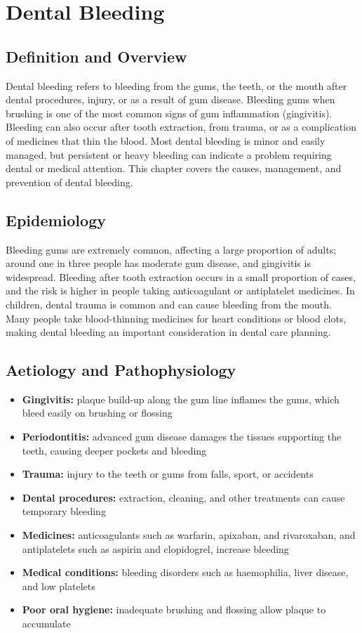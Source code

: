 \chapter{Dental Bleeding}

\section*{Definition and Overview}
Dental bleeding refers to bleeding from the gums, the teeth, or the mouth after dental procedures, injury, or as a result of gum disease. Bleeding gums when brushing is one of the most common signs of gum inflammation (gingivitis). Bleeding can also occur after tooth extraction, from trauma, or as a complication of medicines that thin the blood. Most dental bleeding is minor and easily managed, but persistent or heavy bleeding can indicate a problem requiring dental or medical attention. This chapter covers the causes, management, and prevention of dental bleeding.

\section*{Epidemiology}
Bleeding gums are extremely common, affecting a large proportion of adults; around one in three people has moderate gum disease, and gingivitis is widespread. Bleeding after tooth extraction occurs in a small proportion of cases, and the risk is higher in people taking anticoagulant or antiplatelet medicines. In children, dental trauma is common and can cause bleeding from the mouth. Many people take blood-thinning medicines for heart conditions or blood clots, making dental bleeding an important consideration in dental care planning.

\section*{Aetiology and Pathophysiology}
\begin{itemize}
    \item \textbf{Gingivitis:} plaque build-up along the gum line inflames the gums, which bleed easily on brushing or flossing
    \item \textbf{Periodontitis:} advanced gum disease damages the tissues supporting the teeth, causing deeper pockets and bleeding
    \item \textbf{Trauma:} injury to the teeth or gums from falls, sport, or accidents
    \item \textbf{Dental procedures:} extraction, cleaning, and other treatments can cause temporary bleeding
    \item \textbf{Medicines:} anticoagulants such as warfarin, apixaban, and rivaroxaban, and antiplatelets such as aspirin and clopidogrel, increase bleeding
    \item \textbf{Medical conditions:} bleeding disorders such as haemophilia, liver disease, and low platelets
    \item \textbf{Poor oral hygiene:} inadequate brushing and flossing allow plaque to accumulate
\end{itemize}


